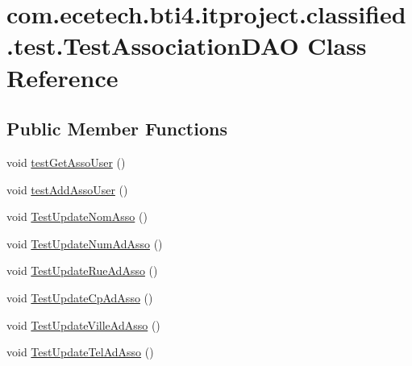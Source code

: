 \hypertarget{classcom_1_1ecetech_1_1bti4_1_1itproject_1_1classified_1_1test_1_1_test_association_d_a_o}{}\section{com.\+ecetech.\+bti4.\+itproject.\+classified.\+test.\+Test\+Association\+D\+AO Class Reference}
\label{classcom_1_1ecetech_1_1bti4_1_1itproject_1_1classified_1_1test_1_1_test_association_d_a_o}
\subsection*{Public Member Functions}
\begin{DoxyCompactItemize}
\item 
void \hyperlink{classcom_1_1ecetech_1_1bti4_1_1itproject_1_1classified_1_1test_1_1_test_association_d_a_o_ab403974b8c441a5af36d4bba8084dcb1}{test\+Get\+Asso\+User} ()
\item 
void \hyperlink{classcom_1_1ecetech_1_1bti4_1_1itproject_1_1classified_1_1test_1_1_test_association_d_a_o_aa273362eba9ca3e2a3f59e91df5f9706}{test\+Add\+Asso\+User} ()
\item 
void \hyperlink{classcom_1_1ecetech_1_1bti4_1_1itproject_1_1classified_1_1test_1_1_test_association_d_a_o_a29e6a529d4987b154cfd8ae54b150c32}{Test\+Update\+Nom\+Asso} ()
\item 
void \hyperlink{classcom_1_1ecetech_1_1bti4_1_1itproject_1_1classified_1_1test_1_1_test_association_d_a_o_ae8bf78de9657e5f642b50d6ce8c4b393}{Test\+Update\+Num\+Ad\+Asso} ()
\item 
void \hyperlink{classcom_1_1ecetech_1_1bti4_1_1itproject_1_1classified_1_1test_1_1_test_association_d_a_o_a52ad273a65bb24f5905165dbd74028e7}{Test\+Update\+Rue\+Ad\+Asso} ()
\item 
void \hyperlink{classcom_1_1ecetech_1_1bti4_1_1itproject_1_1classified_1_1test_1_1_test_association_d_a_o_a4b674d98a860f5e9b413d4cb19a89b47}{Test\+Update\+Cp\+Ad\+Asso} ()
\item 
void \hyperlink{classcom_1_1ecetech_1_1bti4_1_1itproject_1_1classified_1_1test_1_1_test_association_d_a_o_a0df7864f5a02817b61e7ad219a69bf7b}{Test\+Update\+Ville\+Ad\+Asso} ()
\item 
void \hyperlink{classcom_1_1ecetech_1_1bti4_1_1itproject_1_1classified_1_1test_1_1_test_association_d_a_o_a38ea9bd868add0368afd12860f7df8fe}{Test\+Update\+Tel\+Ad\+Asso} ()
\end{DoxyCompactItemize}


